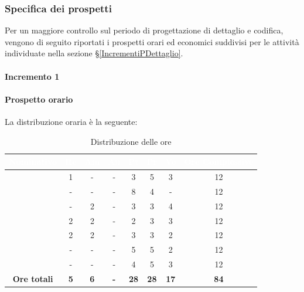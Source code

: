 \subsubsection{Specifica dei prospetti}
Per un maggiore controllo sul periodo di progettazione di dettaglio e codifica, vengono di seguito riportati i prospetti orari ed economici suddivisi per le attività individuate nella sezione \S\ref{IncrementiPDettaglio}.
\paragraph{Incremento 1}
\paragraph*{Prospetto orario}
La distribuzione oraria è la seguente:
\begin{table}[H]
	\begin{center}
		\begin{tabular}{ |c c c c c c c c| }
			\rowcolor{darkblue} 
			\textcolor{white}{\textbf{Nominativo}} & \textcolor{white}{\textbf{Re}} & \textcolor{white}{\textbf{Am}} & \textcolor{white}{\textbf{An}} & \textcolor{white}{\textbf{Pt}} & \textcolor{white}{\textbf{Pr}} & \textcolor{white}{\textbf{Ve}} & \textcolor{white}{\textbf{Ore Complessive}} \\ \hline
		\BL 	& 1  	& -  	& - 	& 3 	& 5 	& 3 	& 12 \\ \hline
		\FF 	& -  	& -  	& - 	& 8 	& 4 	& -  	& 12 \\ \hline
		\MM 	& -  	& 2  	& - 	& 3 	& 3 	& 4 	& 12 \\ \hline
		\PC 	& 2 	& 2  	& - 	& 2 	& 3 	& 3 	& 12 \\ \hline
		\TG 	& 2  	& 2		& - 	& 3 	& 3 	& 2 	& 12 \\ \hline
		\TL 	& -  	& - 	& - 	& 5 	&5 	& 2 	& 12 \\ \hline
		\VD 	& -  	& -  	& - 	& 4 	& 5 	& 3 	& 12 \\ \hline
		\textbf{Ore totali} & \textbf{5} & \textbf{6} & \textbf{-} & \textbf{28} & \textbf{28} & \textbf{17} & \textbf{84} \\ \hline
		\end{tabular}
		\caption{Distribuzione delle ore}
	\end{center}
\end{table}

